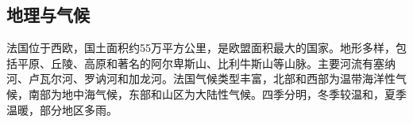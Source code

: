 \subsection{地理与气候}

法国位于西欧，国土面积约55万平方公里，是欧盟面积最大的国家。地形多样，包括平原、丘陵、高原和著名的阿尔卑斯山、比利牛斯山等山脉。主要河流有塞纳河、卢瓦尔河、罗讷河和加龙河。法国气候类型丰富，北部和西部为温带海洋性气候，南部为地中海气候，东部和山区为大陆性气候。四季分明，冬季较温和，夏季温暖，部分地区多雨。
